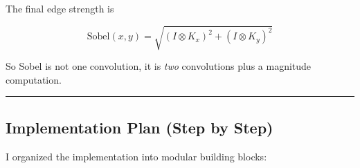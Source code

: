 \documentclass[
]{article}
\begin{document}
The final edge strength is

\[\text{Sobel}(x,y) = \sqrt{(I \otimes K_x)^2 + (I \otimes K_y)^2}\]

So Sobel is not one convolution, it is \emph{two} convolutions plus a
magnitude computation.

\begin{center}\rule{0.5\linewidth}{0.5pt}\end{center}

\subsection{Implementation Plan (Step by
Step)}\label{implementation-plan-step-by-step}

I organized the implementation into modular building blocks:
\end{document}
